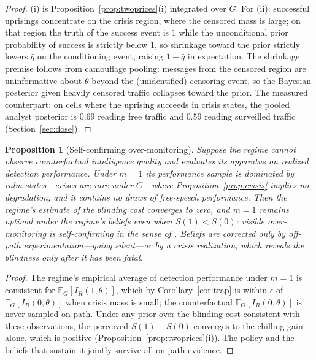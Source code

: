 \documentclass[11pt]{article}
\newtheorem{proposition}{Proposition}
\theoremstyle{remark}
\newcommand{\E}{\mathbb{E}}
\begin{document}
\begin{proof}
(i) is Proposition~\ref{prop:twoprices}(i) integrated over $G$. For (ii): successful uprisings concentrate on the crisis region, where the censored mass is large; on that region the truth of the success event is $1$ while the unconditional prior probability of success is strictly below $1$, so shrinkage toward the prior strictly lowers $\hat q$ on the conditioning event, raising $1 - \hat q$ in expectation. The shrinkage premise follows from camouflage pooling: messages from the censored region are uninformative about $\theta$ beyond the (unidentified) censoring event, so the Bayesian posterior given heavily censored traffic collapses toward the prior. The measured counterpart: on cells where the uprising succeeds in crisis states, the pooled analyst posterior is $0.69$ reading free traffic and $0.59$ reading surveilled traffic (Section~\ref{sec:dose}).
\end{proof}

\begin{proposition}[Self-confirming over-monitoring]\label{prop:selfconfirm}
Suppose the regime cannot observe counterfactual intelligence quality and evaluates its apparatus on realized detection performance. Under $m=1$ its performance sample is dominated by calm states---crises are rare under $G$---where Proposition~\ref{prop:crisis} implies no degradation, and it contains no draws of free-speech performance. Then the regime's estimate of the blinding cost converges to zero, and $m=1$ remains optimal under the regime's beliefs even when $S(1) < S(0)$: visible over-monitoring is self-confirming in the sense of \citet{fudenberg1993}. Beliefs are corrected only by off-path experimentation---going silent---or by a crisis realization, which reveals the blindness only after it has been fatal.
\end{proposition}

\begin{proof}
The regime's empirical average of detection performance under $m=1$ is consistent for $\E_G[I_R(1,\theta)]$, which by Corollary~\ref{cor:trap} is within $\epsilon$ of $\E_G[I_R(0,\theta)]$ when crisis mass is small; the counterfactual $\E_G[I_R(0,\theta)]$ is never sampled on path. Under any prior over the blinding cost consistent with these observations, the perceived $S(1) - S(0)$ converges to the chilling gain alone, which is positive (Proposition~\ref{prop:twoprices}(i)). The policy and the beliefs that sustain it jointly survive all on-path evidence.
\end{proof}
\end{document}
